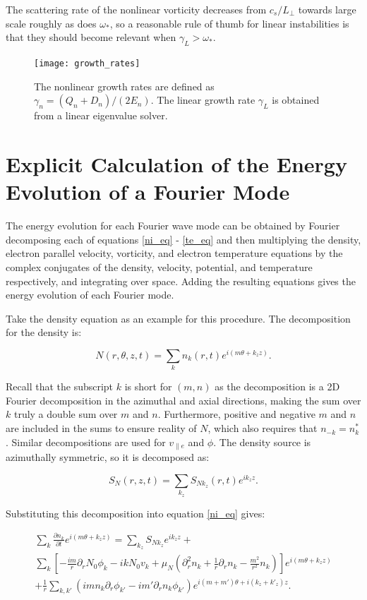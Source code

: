 \documentclass[12pt]{article}
\def\beq{\begin{equation}}
\def\eeq{\end{equation}}
\def\beqar{\begin{eqnarray}}
\def\eeqar{\end{eqnarray}}
\newcommand{\pdiff}[2]{\frac{\partial#1}{\partial#2}}
\newcommand{\pdr}{\partial_r}
\newcommand{\pdrr}{\partial^2_r}
\newcommand{\vpe}{v_{\parallel e}}
\begin{document}
The scattering rate of the nonlinear vorticity decreases from $c_s/L_\perp$ towards large scale roughly as does $\omega_*$, so a reasonable rule of thumb for linear instabilities is
that they should become relevant when $\gamma_L > \omega_*$.

\begin{figure}
\texttt{[image: growth\_rates]}
\hfil
\caption{The nonlinear growth rates are defined as $\gamma_n = (Q_n + D_n)/(2 E_n)$. The linear growth rate $\gamma_L$ is obtained from a linear eigenvalue solver.}
\label{growth_rates}
\end{figure}


\appendix

\section{Explicit Calculation of the Energy Evolution of a Fourier Mode}

The energy evolution for each Fourier wave mode can be obtained by Fourier decomposing each of equations \ref{ni_eq} - \ref{te_eq}
and then multiplying the density, electron parallel velocity, vorticity, and electron temperature equations by the complex conjugates of the 
density, velocity, potential, and temperature respectively, and integrating over space.
Adding the resulting equations gives the energy evolution of each Fourier mode.

Take the density equation as an example for this procedure. The decomposition for the density is:

\beq
\label{density_decomp}
N(r,\theta,z,t) = \sum_{k} n_k(r,t) e^{i(m \theta + k_z z)}.
\eeq

Recall that the subscript $k$ is short for $(m,n)$ as the decomposition is a 2D Fourier decomposition in the azimuthal and axial directions, making the sum over $k$ truly
a double sum over $m$ and $n$. Furthermore, positive and negative
$m$ and $n$ are included in the sums to ensure reality of $N$, which also requires that $n_{-k} = n_k^*$.
Similar decompositions are used for $\vpe$ and $\phi$. The density source is azimuthally symmetric, so it is decomposed as:

\beq
\label{source_decomp}
S_N(r,z,t) = \sum_{k_z} S_{N k_z}(r,t) e^{i k_z z}.
\eeq

Substituting this decomposition into equation \ref{ni_eq} gives:

\beqar
\label{density_eq_fourier}
\sum_{k} \pdiff{n_k}{t} e^{i(m \theta + k_z z)} = \sum_{k_z} S_{N k_z} e^{i k_z z} + \nonumber \\
\sum_{k} \left[ -\frac{i m}{r} \pdr N_0 \phi_k - i k N_0 v_k + \mu_N(\pdrr n_k + \frac{1}{r} \pdr n_k - \frac{m^2}{r^2} n_k) \right] e^{i(m \theta + k_z z)} \nonumber \\
+ \frac{1}{r} \sum_{k,k'} (i m n_k \pdr \phi_{k'} - i m' \pdr n_k \phi_{k'}) e^{i (m + m') \theta + i (k_z + k'_z) z}.
\eeqar
\end{document}
